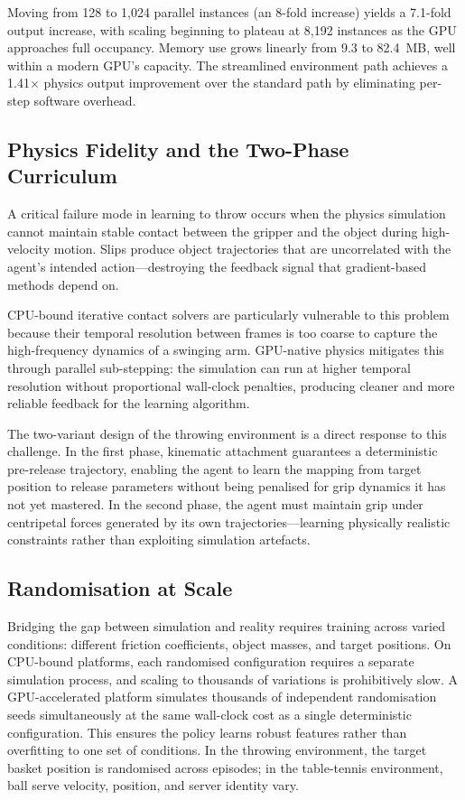 \documentclass[11pt, a4paper]{article}
\begin{document}
Moving from 128 to 1,024 parallel instances (an 8-fold increase) yields a 7.1-fold output increase, with scaling beginning to plateau at 8,192 instances as the GPU approaches full occupancy. Memory use grows linearly from 9.3 to 82.4~MB, well within a modern GPU's capacity. The streamlined environment path achieves a 1.41$\times$ physics output improvement over the standard path by eliminating per-step software overhead.

\subsection{Physics Fidelity and the Two-Phase Curriculum}

A critical failure mode in learning to throw occurs when the physics simulation cannot maintain stable contact between the gripper and the object during high-velocity motion. Slips produce object trajectories that are uncorrelated with the agent's intended action---destroying the feedback signal that gradient-based methods depend on.

CPU-bound iterative contact solvers are particularly vulnerable to this problem because their temporal resolution between frames is too coarse to capture the high-frequency dynamics of a swinging arm. GPU-native physics mitigates this through parallel sub-stepping: the simulation can run at higher temporal resolution without proportional wall-clock penalties, producing cleaner and more reliable feedback for the learning algorithm.

The two-variant design of the throwing environment is a direct response to this challenge. In the first phase, kinematic attachment guarantees a deterministic pre-release trajectory, enabling the agent to learn the mapping from target position to release parameters without being penalised for grip dynamics it has not yet mastered. In the second phase, the agent must maintain grip under centripetal forces generated by its own trajectories---learning physically realistic constraints rather than exploiting simulation artefacts.

\subsection{Randomisation at Scale}

Bridging the gap between simulation and reality requires training across varied conditions: different friction coefficients, object masses, and target positions. On CPU-bound platforms, each randomised configuration requires a separate simulation process, and scaling to thousands of variations is prohibitively slow. A GPU-accelerated platform simulates thousands of independent randomisation seeds simultaneously at the same wall-clock cost as a single deterministic configuration. This ensures the policy learns robust features rather than overfitting to one set of conditions. In the throwing environment, the target basket position is randomised across episodes; in the table-tennis environment, ball serve velocity, position, and server identity vary.
\end{document}
